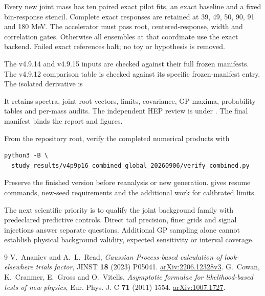 \documentclass[11pt]{article}
\begin{document}
Every new joint mass has ten paired exact pilot fits, an exact baseline and a fixed bin-response stencil. Complete exact responses are retained at 39, 49, 50, 90, 91 and 180 MeV. The accelerator must pass root, centered-response, width and correlation gates. Otherwise all ensembles at that coordinate use the exact backend. Failed exact references halt; no toy or hypothesis is removed.

The v4.9.14 and v4.9.15 inputs are checked against their full frozen manifests. The v4.9.12 comparison table is checked against its specific frozen-manifest entry. The isolated derivative is
\begin{center}\small{}\end{center}
It retains spectra, joint root vectors, limits, covariance, GP maxima, probability tables and per-mass audits. The independent HEP review is under . The final manifest binds the report and figures.

From the repository root, verify the completed numerical products with
\begin{verbatim}
python3 -B \
  study_results/v4p9p16_combined_global_20260906/verify_combined.py
\end{verbatim}
Preserve the finished version before reanalysis or new generation.  gives resume commands, new-seed requirements and the additional work for calibrated limits.

The next scientific priority is to qualify the joint background family with predeclared predictive controls. Direct tail precision, finer grids and signal injections answer separate questions. Additional GP sampling alone cannot establish physical background validity, expected sensitivity or interval coverage.

\begin{thebibliography}{9}
 V.~Ananiev and A.~L.~Read, \emph{Gaussian Process-based calculation of look-elsewhere trials factor}, JINST \textbf{18} (2023) P05041. \href{https://arxiv.org/abs/2206.12328v3}{arXiv:2206.12328v3}.
\bibitem{cowan} G.~Cowan, K.~Cranmer, E.~Gross and O.~Vitells, \emph{Asymptotic formulae for likelihood-based tests of new physics}, Eur. Phys. J. C \textbf{71} (2011) 1554. \href{https://arxiv.org/abs/1007.1727}{arXiv:1007.1727}.
\end{thebibliography}
\end{document}
